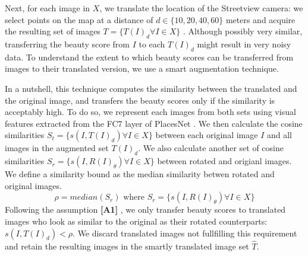 Next, for each image in $X$, we translate the location of the Streetview camera: we select points on the map at a distance of $d \in \{10,20,40,60\}$ meters and acquire the resulting set of images $T=\{T(I)_d \forall I \in X\}$%
. Although possibly very similar, transferring the beauty score from $I$ to each $T(I)_d$ might result in very noisy data. To understand the extent to which beauty scores can be transferred from images to their translated version, we use a smart augmentation technique. 


In a nutshell, this technique computes the similarity between the translated and the original image, and transfers the beauty scores only if the similarity is acceptably high.
To do so, we represent each images from both sets using visual features extracted from the FC7 layer of PlacesNet \cite{zhou2014learning}. We then calculate the cosine similarities $ S_t = \{s(I,T(I)_d) \forall I \in X \}$
between each original image $I$ and all images in the augmented set $T(I)_d$. 
We also calculate another set of cosine similarities  $ S_r = \{s(I,R(I)_{\theta}) \forall I \in X \}$ between rotated and origianl images. We define a similarity bound as the median similarity betwen rotated and original images.
\begin{equation}
\rho = median(S_r) \text{ where }{S_r} = \{s(I,R(I)_{\theta}) \forall I \in X \}
\label{eq:bound}
\end{equation}
Following the assumption \textbf{[A1]} , we only transfer beauty scores to translated images who look as similar to the original as their rotated counterparts: $s(I,T(I)_d) < \rho$. We discard translated images not fullfilling this requirement and retain the resulting images in the smartly translated image set $\hat{T}$. %



